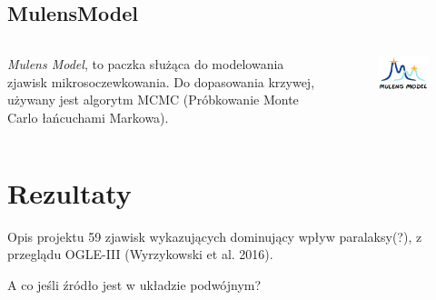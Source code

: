 \documentclass{beamer}
\begin{document}
\subsection{MulensModel}
\begin{frame}
    \begin{columns}
        \begin{column}{0.5\linewidth}
            \emph{Mulens Model}\cite{MulensModel_paper}, to paczka służąca do modelowania zjawisk mikrosoczewkowania.
            Do dopasowania krzywej, używany jest algorytm MCMC (Próbkowanie Monte Carlo łańcuchami Markowa).

        \end{column}

        \begin{column}{0.5\linewidth}
            \begin{figure}
                \includegraphics[width = \textwidth]{logoMM_crop_4_372x260.png}
            \end{figure}
        \end{column}
    \end{columns}
\end{frame}

\section{Rezultaty}

\begin{frame}{Opis projektu}
    59 zjawisk wykazujących dominujący wpływ paralaksy(?), z przeglądu OGLE-III (Wyrzykowski et al. 2016)\cite{Basis_paper}.

    \bigskip
    \bigskip

    A co jeśli źródło jest w układzie podwójnym?
\end{frame}
\end{document}
